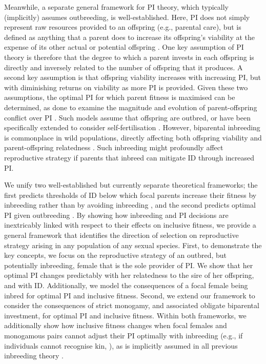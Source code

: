 \documentclass[12pt]{article}
\begin{document}
Meanwhile, a separate general framework for PI theory, which typically (implicitly) assumes outbreeding, is well-established. Here, PI does not simply represent raw resources provided to an offspring (e.g., parental care), but is defined as anything that a parent does to increase its offspring's viability at the expense of its other actual or potential offspring \cite[][]{Trivers1972, Trivers1974}. One key assumption of PI theory is therefore that the degree to which a parent invests in each offspring is directly and inversely related to the number of offspring that it produces. A second key assumption is that offspring viability increases with increasing PI, but with diminishing returns on viability as more PI is provided. Given these two assumptions, the optimal PI for which parent fitness is maximised can be determined, as done to examine the magnitude and evolution of parent-offspring conflict over PI \cite[][]{Macnair1978, Parker1978, Parker1985, DeJong2005, Kuijper2012}. Such models assume that offspring are outbred, or have been specifically extended to consider self-fertilisation \cite[][]{DeJong2005}. However, biparental inbreeding is commonplace in wild populations, directly affecting both offspring viability and parent-offspring relatedness \cite[][]{Trivers1974, Lynch1998, OGrady2006, Charlesworth2009, Reid2016}. Such inbreeding might profoundly affect reproductive strategy if parents that inbreed can mitigate ID through increased PI.

We unify two well-established but currently separate theoretical frameworks; the first predicts thresholds of ID below which focal parents increase their fitness by inbreeding rather than by avoiding inbreeding \cite[][]{Parker1979}, and the second predicts optimal PI given outbreeding \cite[][]{Macnair1978}. By showing how inbreeding and PI decisions are inextricably linked with respect to their effects on inclusive fitness, we provide a general framework that identifies the direction of selection on reproductive strategy arising in any population of any sexual species. First, to demonstrate the key concepts, we focus on the reproductive strategy of an outbred, but potentially inbreeding, female that is the sole provider of PI. We show that her optimal PI changes predictably with her relatedness to the sire of her offspring, and with ID. Additionally, we model the consequences of a focal female being inbred for optimal PI and inclusive fitness. Second, we extend our framework to consider the consequences of strict monogamy, and associated obligate biparental investment, for optimal PI and inclusive fitness. Within both frameworks, we additionally show how inclusive fitness changes when focal females and monogamous pairs cannot adjust their PI optimally with inbreeding (e.g., if individuals cannot recognise kin, \cite[][]{Penn2010}), as is implicitly assumed in all previous inbreeding theory \cite[][]{Parker1979, Parker2006, Waser1986, Kokko2006, Duthie2015a}.
\end{document}
